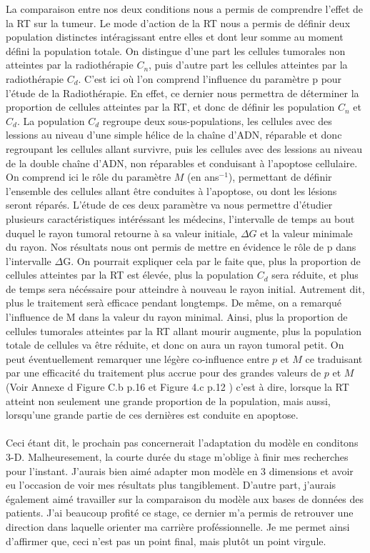 \documentclass[12pt,a4paper]{article}
\begin{document}
La comparaison entre nos deux conditions nous a permis de comprendre l'effet de la RT sur la tumeur. Le mode d'action de la RT nous a permis de définir deux population distinctes intéragissant entre elles et dont leur somme au moment défini la population totale. On distingue d'une part les cellules tumorales non atteintes par la radiothérapie $C_n$, puis d'autre part les cellules atteintes par la radiothérapie $C_d$.  C'est ici où l'on comprend l'influence du paramètre p pour l'étude de la Radiothérapie. En effet, ce dernier nous permettra de déterminer la proportion de cellules atteintes par la RT, et donc de définir les population $C_n$ et $C_d$. La population $C_d$ regroupe deux sous-populations, les cellules avec des lessions au niveau d'une simple hélice de la chaîne d'ADN, réparable et donc regroupant les cellules allant survivre, puis les cellules avec des lessions au niveau de la double chaîne d'ADN, non réparables et conduisant à l'apoptose cellulaire. On comprend ici le rôle du paramètre $M$ (en ans$^{-1}$), permettant de définir l'ensemble des cellules allant être conduites à l'apoptose, ou dont les lésions seront réparés. L'étude de ces deux paramètre va nous permettre d'étudier plusieurs caractéristiques intéréssant les médecins, l'intervalle de temps au bout duquel le rayon tumoral retourne à sa valeur initiale, $\Delta G$ et la valeur minimale du rayon. Nos résultats nous ont permis de mettre en évidence le rôle de p dans l'intervalle $\Delta$G. On pourrait expliquer cela par le faite que, plus la proportion de cellules atteintes par la RT est élevée, plus la population $C_d$ sera réduite, et plus de temps sera nécéssaire pour atteindre à nouveau le rayon initial. Autrement dit, plus le traitement serà efficace pendant longtemps. De même, on a remarqué l'influence de M dans la valeur du rayon minimal. Ainsi, plus la proportion de cellules tumorales atteintes par la RT allant mourir augmente, plus la population totale de cellules va être réduite, et donc on aura un rayon tumoral petit. On peut éventuellement remarquer une légère co-influence entre $p$ et $M$ ce traduisant par une efficacité du traitement plus accrue pour des grandes valeurs de $p$ et $M$ (Voir Annexe d Figure C.b p.16 et Figure 4.c p.12 )  c'est à dire, lorsque la RT atteint non seulement une grande proportion de la population, mais aussi, lorsqu'une grande partie de ces dernières est conduite en apoptose. 
\\
\\
Ceci étant dit, le prochain pas concernerait l'adaptation du modèle en conditons 3-D. Malheuresement, la courte durée du stage m'oblige à finir mes recherches pour l'instant. J'aurais bien aimé adapter mon modèle en 3 dimensions et avoir eu l'occasion de voir mes résultats plus tangiblement. D'autre part, j'aurais également aimé travailler sur la comparaison du modèle aux bases de données des patients. J'ai beaucoup profité ce stage, ce dernier m'a permis de retrouver une direction dans laquelle orienter ma carrière proféssionnelle. Je me permet ainsi d'affirmer que, ceci n'est pas un point final, mais plutôt un point virgule. 
\\
\end{document}
